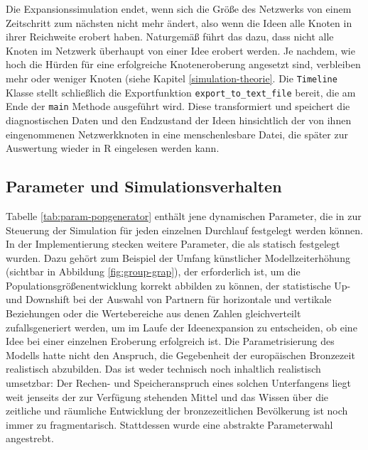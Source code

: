 \documentclass[openany,twoside,twocolumn]{book}
\begin{document}
Die Expansionssimulation endet, wenn sich die Größe des Netzwerks von
einem Zeitschritt zum nächsten nicht mehr ändert, also wenn die Ideen
alle Knoten in ihrer Reichweite erobert haben. Naturgemäß führt das
dazu, dass nicht alle Knoten im Netzwerk überhaupt von einer Idee
erobert werden. Je nachdem, wie hoch die Hürden für eine erfolgreiche
Knoteneroberung angesetzt sind, verbleiben mehr oder weniger Knoten
(siehe Kapitel \ref{simulation-theorie}. Die \texttt{Timeline} Klasse
stellt schließlich die Exportfunktion \texttt{export\_to\_text\_file}
bereit, die am Ende der \texttt{main} Methode ausgeführt wird. Diese
transformiert und speichert die diagnostischen Daten und den Endzustand
der Ideen hinsichtlich der von ihnen eingenommenen Netzwerkknoten in
eine menschenlesbare Datei, die später zur Auswertung wieder in R
eingelesen werden kann.

\hypertarget{simulation-parameters}{%
\subsection{Parameter und
Simulationsverhalten}\label{simulation-parameters}}

Tabelle \ref{tab:param-popgenerator} enthält jene dynamischen Parameter,
die in zur Steuerung der Simulation für jeden einzelnen Durchlauf
festgelegt werden können. In der Implementierung stecken weitere
Parameter, die als statisch festgelegt wurden. Dazu gehört zum Beispiel
der Umfang künstlicher Modellzeiterhöhung (sichtbar in Abbildung
\ref{fig:group-grap}), der erforderlich ist, um die
Populationsgrößenentwicklung korrekt abbilden zu können, der
statistische Up- und Downshift bei der Auswahl von Partnern für
horizontale und vertikale Beziehungen oder die Wertebereiche aus denen
Zahlen gleichverteilt zufallsgeneriert werden, um im Laufe der
Ideenexpansion zu entscheiden, ob eine Idee bei einer einzelnen
Eroberung erfolgreich ist. Die Parametrisierung des Modells hatte nicht
den Anspruch, die Gegebenheit der europäischen Bronzezeit realistisch
abzubilden. Das ist weder technisch noch inhaltlich realistisch
umsetzbar: Der Rechen- und Speicheranspruch eines solchen Unterfangens
liegt weit jenseits der zur Verfügung stehenden Mittel und das Wissen
über die zeitliche und räumliche Entwicklung der bronzezeitlichen
Bevölkerung ist noch immer zu fragmentarisch. Stattdessen wurde eine
abstrakte Parameterwahl angestrebt.
\end{document}

